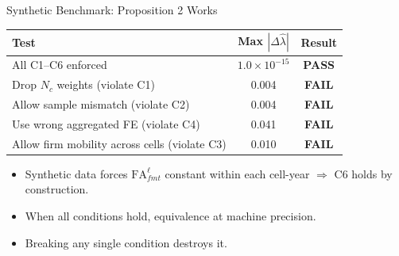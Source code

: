 \documentclass[aspectratio=169,11pt]{beamer}
\newcommand{\FA}{\mathrm{FA}}
\newcommand{\Pass}{\textcolor{notegreen}{\textbf{PASS}}}
\newcommand{\Fail}{\textcolor{alertred}{\textbf{FAIL}}}
\begin{document}
\begin{frame}{Synthetic Benchmark: Proposition 2 Works}

\small
\begin{center}
\begin{tabular}{p{5.8cm}cc}
\toprule
\textbf{Test} & \textbf{Max $|\Delta \hat\lambda|$} & \textbf{Result} \\
\midrule
All C1--C6 enforced & $1.0 \times 10^{-15}$ & \Pass \\
Drop $N_c$ weights (violate C1) & 0.004 & \Fail \\
Allow sample mismatch (violate C2) & 0.004 & \Fail \\
Use wrong aggregated FE (violate C4) & 0.041 & \Fail \\
Allow firm mobility across cells (violate C3) & 0.010 & \Fail \\
\bottomrule
\end{tabular}
\end{center}

\medskip
\begin{itemize}\setlength{\itemsep}{3pt}
  \item Synthetic data forces $\FA^\ell_{fmt}$ constant within each cell-year $\Rightarrow$ C6 holds by construction.
  \item When all conditions hold, equivalence at machine precision.
  \item Breaking any single condition destroys it.
\end{itemize}

\end{frame}
\end{document}
